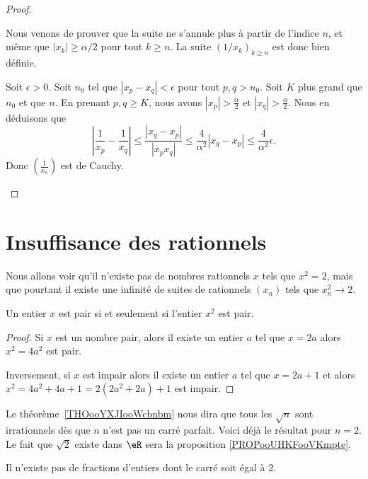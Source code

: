 \begin{proof}
\begin{enumerate}
		      Nous venons de prouver que la suite ne s'annule plus à partir de l'indice \( n\), et même que \( | x_k |\geq\alpha/2\) pour tout \( k\geq n\). La suite \( (1/x_k)_{k\geq n}\) est donc bien définie.

		      Soit \( \epsilon>0\). Soit \( n_0\) tel que \( | x_p-x_q |<\epsilon\) pour tout \( p,q>n_0\). Soit \( K\) plus grand que \( n_0\) et que \( n\). En prenant \( p,q\geq K\), nous avons \( |  x_p|>\frac{ \alpha }{2}\) et \( | x_q |>\frac{ \alpha }{2}\). Nous en déduisons que
		      \begin{equation}
			      \left| \frac{1}{ x_p }-\frac{1}{ x_q } \right| \leq \frac{ | x_q-x_p | }{ | x_px_q | }\leq \frac{ 4 }{ \alpha^2 }| x_q-x_p |\leq \frac{ 4 }{ \alpha^2 }\epsilon.
		      \end{equation}
		      Donc \( \left( \frac{1}{ x_n } \right)\) est de Cauchy.
	\end{enumerate}
\end{proof}


\section{Insuffisance des rationnels}

Nous allons voir qu'il n'existe pas de nombres rationnels \( x\) tels que \( x^2=2\), mais que pourtant il existe une infinité de suites de rationnels \( (x_n)\) tels que \(  x_n^2\to 2  \).

\begin{lemma}       \label{LemJPIUooWFHaFM}
	Un entier \( x\) est pair si et seulement si l'entier \( x^2\) est pair.
\end{lemma}

\begin{proof}
	Si \( x\) est un nombre pair, alors il existe un entier \( a\) tel que \( x=2a\) alors \( x^2=4a^2\) est pair.

	Inversement, si \( x\) est impair alors il existe un entier \( a\) tel que \( x=2a+1\) et alors \( x^2=4a^2+4a+1=2(2a^2+2a)+1\) est impair.
\end{proof}

Le théorème~\ref{THOooYXJIooWcbnbm} nous dira que tous les \( \sqrt{n}\) sont irrationnels dès que \( n\) n'est pas un carré parfait. Voici déjà le résultat pour \( n=2\). Le fait que \( \sqrt{ 2 }\) existe dans \( \eR\) sera la proposition \ref{PROPooUHKFooVKmpte}.
\begin{proposition}     \label{PropooRJMSooPrdeJb}
	Il n'existe pas de fractions d'entiers dont le carré soit égal à \( 2\).
\end{proposition}


